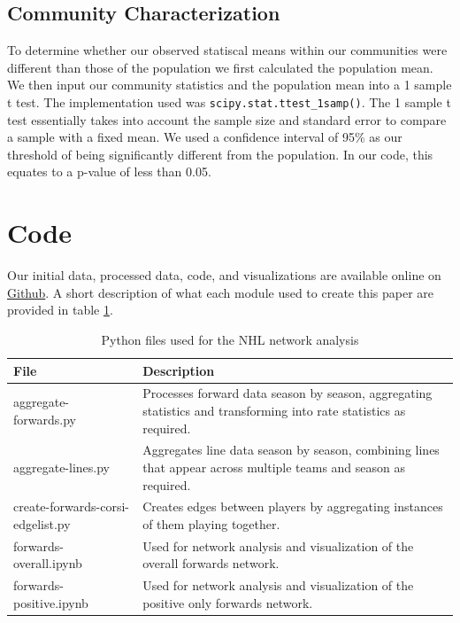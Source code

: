 \documentclass{article}
\begin{document}
\subsection{Community Characterization}
To determine whether our observed statiscal means within our communities were different than those of the population we first calculated the population mean.
We then input our community statistics and the population mean into a 1 sample t test.
The implementation used was \texttt{scipy.stat.ttest\_1samp()}.
The 1 sample t test essentially takes into account the sample size and standard error to compare a sample with a fixed mean.
We used a confidence interval of 95\% as our threshold of being significantly different from the population.
In our code, this equates to a p-value of less than 0.05.


\section{Code}
Our initial data, processed data, code, and visualizations are available online on \hyperlink{https://github.com/emmettcollings/nhl-linemate-network}{Github}.
A short description of what each module used to create this paper are provided in table \ref{code}.

\begin{table}[H]
\centering
\begin{tabular}{|l|p{6cm}|}
\hline
File & Description \\
\hline
aggregate-forwards.py             & Processes forward data season by season, aggregating statistics and transforming into rate statistics as required. \\ \hline
aggregate-lines.py                & Aggregates line data season by season, combining lines that appear across multiple teams and season as required. \\ \hline
create-forwards-corsi-edgelist.py & Creates edges between players by aggregating instances of them playing together. \\ \hline
forwards-overall.ipynb            & Used for network analysis and visualization of the overall forwards network. \\ \hline
forwards-positive.ipynb           & Used for network analysis and visualization of the positive only forwards network. \\ \hline
\end{tabular}
\caption{Python files used for the NHL network analysis}
\label{code}
\end{table}
\end{document}
